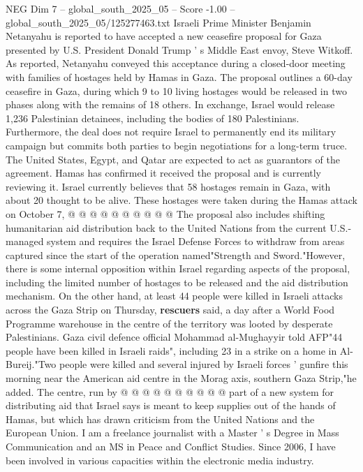 \begin{textsample}{NEG Dim 7 – global\_south\_2025\_05 – Score -1.00 – global\_south\_2025\_05/125277463.txt}  \label{ex:f7_neg_014}
Israeli Prime Minister Benjamin Netanyahu is reported to have accepted a new ceasefire proposal for Gaza presented by U.S.
President Donald Trump ' s Middle East envoy, Steve Witkoff.
As reported, Netanyahu conveyed this acceptance during a closed-door meeting with families of hostages held by Hamas in Gaza.
The proposal outlines a 60-day ceasefire in Gaza, during which 9 to 10 living hostages would be released in two phases along with the remains of 18 others.
In exchange, Israel would release 1,236 Palestinian detainees, including the bodies of 180 Palestinians.
Furthermore, the deal does not require Israel to permanently end its military campaign but commits both parties to begin negotiations for a long-term truce.
The United States, Egypt, and Qatar are expected to act as guarantors of the agreement.
Hamas has confirmed it received the proposal and is currently reviewing it.
Israel currently believes that 58 hostages remain in Gaza, with about 20 thought to be alive.
These hostages were taken during the Hamas attack on October 7, @ @ @ @ @ @ @ @ @ @ The proposal also includes shifting humanitarian aid distribution back to the United Nations from the current U.S.-managed system and requires the Israel Defense Forces to withdraw from areas captured since the start of the operation named"Strength and Sword."However, there is some internal opposition within Israel regarding aspects of the proposal, including the limited number of hostages to be released and the aid distribution mechanism.
On the other hand, at least 44 people were killed in Israeli attacks across the Gaza Strip on Thursday, \textbf{rescuers} said, a day after a World Food Programme warehouse in the centre of the territory was looted by desperate Palestinians.
Gaza civil defence official Mohammad al-Mughayyir told AFP"44 people have been killed in Israeli raids", including 23 in a strike on a home in Al-Bureij."Two people were killed and several injured by Israeli forces ' gunfire this morning near the American aid centre in the Morag axis, southern Gaza Strip,"he added.
The centre, run by @ @ @ @ @ @ @ @ @ @ part of a new system for distributing aid that Israel says is meant to keep supplies out of the hands of Hamas, but which has drawn criticism from the United Nations and the European Union.
I am a freelance journalist with a Master ' s Degree in Mass Communication and an MS in Peace and Conflict Studies.
Since 2006, I have been involved in various capacities within the electronic media industry.

\end{textsample}
